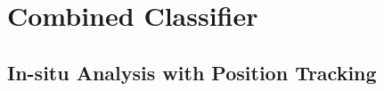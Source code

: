 %
%
%
%
%
%
%
%
\section{Combined Classifier}

\subsection{In-situ Analysis with Position Tracking}

